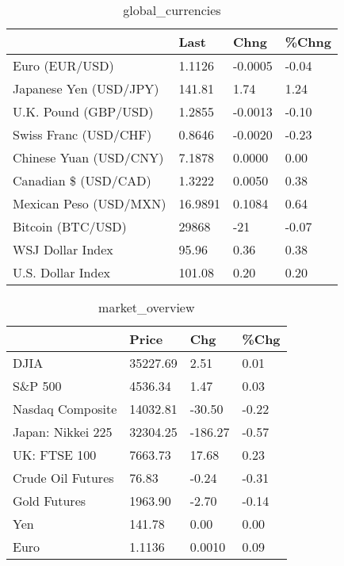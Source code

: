 \documentclass{article}%
\begin{document}
%


\begin{table}[htbp]%
\caption{global\_currencies}%
\centering%
\begin{adjustbox}{width=1\textwidth}%
\begin{tabular}{llll}
\toprule
                       &    Last &    Chng & \%Chng \\
\midrule
        Euro (EUR/USD) &  1.1126 & -0.0005 & -0.04 \\
Japanese Yen (USD/JPY) &  141.81 &    1.74 &  1.24 \\
  U.K. Pound (GBP/USD) &  1.2855 & -0.0013 & -0.10 \\
 Swiss Franc (USD/CHF) &  0.8646 & -0.0020 & -0.23 \\
Chinese Yuan (USD/CNY) &  7.1878 &  0.0000 &  0.00 \\
  Canadian \$ (USD/CAD) &  1.3222 &  0.0050 &  0.38 \\
Mexican Peso (USD/MXN) & 16.9891 &  0.1084 &  0.64 \\
     Bitcoin (BTC/USD) &   29868 &     -21 & -0.07 \\
      WSJ Dollar Index &   95.96 &    0.36 &  0.38 \\
     U.S. Dollar Index &  101.08 &    0.20 &  0.20 \\
\bottomrule
\end{tabular}
%
\end{adjustbox}%
\end{table}

%


\begin{table}[htbp]%
\caption{market\_overview}%
\centering%
\begin{adjustbox}{width=1\textwidth}%
\begin{tabular}{llll}
\toprule
                  &    Price &     Chg &  \%Chg \\
\midrule
             DJIA & 35227.69 &    2.51 &  0.01 \\
          S\&P 500 &  4536.34 &    1.47 &  0.03 \\
 Nasdaq Composite & 14032.81 &  -30.50 & -0.22 \\
Japan: Nikkei 225 & 32304.25 & -186.27 & -0.57 \\
     UK: FTSE 100 &  7663.73 &   17.68 &  0.23 \\
Crude Oil Futures &    76.83 &   -0.24 & -0.31 \\
     Gold Futures &  1963.90 &   -2.70 & -0.14 \\
              Yen &   141.78 &    0.00 &  0.00 \\
             Euro &   1.1136 &  0.0010 &  0.09 \\
\bottomrule
\end{tabular}
%
\end{adjustbox}%
\end{table}

%
\end{document}
